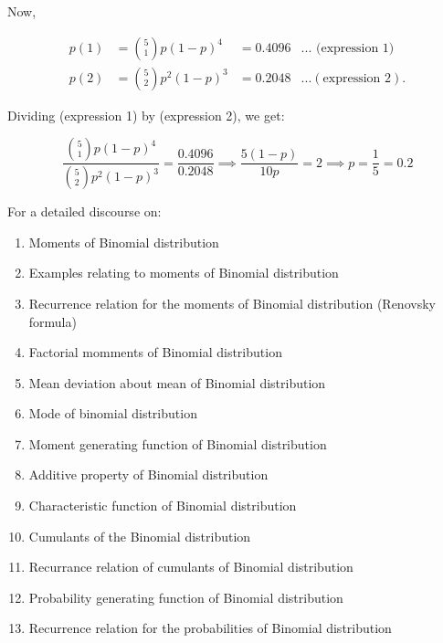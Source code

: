 \documentclass[ignorenonframetext,aspectratio=169]{beamer}
\providecommand{\tightlist}{%
  \setlength{\itemsep}{0pt}\setlength{\parskip}{0pt}}
\begin{document}
\begin{frame}{}
\protect\hypertarget{section-25}{}

Now,

\[
\begin{aligned}
p(1) &= \binom{5}{1} p(1-p)^4 &= 0.4096 & ... \text{ (expression 1) } \\ 
p(2) &= \binom{5}{2} p^2(1-p)^3 &= 0.2048 & ... (\text{expression 2}).
\end{aligned}
\]

Dividing (expression 1) by (expression 2), we get:

\[
\frac{\binom{5}{1} p(1-p)^4}{\binom{5}{2} p^2(1-p)^3} = \frac{0.4096}{0.2048} \implies \frac{5(1-p)}{10p} = 2 \implies p = \frac{1}{5} = 0.2
\]

\end{frame}

\begin{frame}{}
\protect\hypertarget{section-26}{}

For a detailed discourse on:

\begin{enumerate}
\tightlist
\item
  Moments of Binomial distribution
\item
  Examples relating to moments of Binomial distribution
\item
  Recurrence relation for the moments of Binomial distribution (Renovsky
  formula)
\item
  Factorial momments of Binomial distribution
\item
  Mean deviation about mean of Binomial distribution
\item
  Mode of binomial distribution
\item
  Moment generating function of Binomial distribution
\end{enumerate}

\end{frame}

\begin{frame}{}
\protect\hypertarget{section-27}{}

\begin{enumerate}
\setcounter{enumi}{7}
\tightlist
\item
  Additive property of Binomial distribution
\item
  Characteristic function of Binomial distribution
\item
  Cumulants of the Binomial distribution
\item
  Recurrance relation of cumulants of Binomial distribution
\item
  Probability generating function of Binomial distribution
\item
  Recurrence relation for the probabilities of Binomial distribution
\end{enumerate}

\end{frame}
\end{document}
